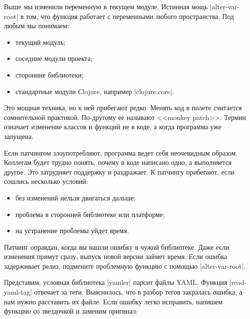 Выше мы изменили переменную в текущем модуле. Истинная мощь
\spverb|alter-var-root| в том, что функция работает с переменными любого
пространства. Под любым мы понимаем:

\begin{itemize}

\item
  текущий модуль;

\item
  соседние модули проекта;

\item
  сторонние библиотеки;

\item
  стандартные модули Сlojure, например \spverb|clojure.core|.

\end{itemize}

Это мощная техника, но к ней прибегают редко. Менять код в полете считается
сомнительной практикой. По-другому ее называют <<monkey
patch>>. Термин означает
изменение классов и функций не в коде, а когда программа уже запущена.

Если патчингом злоупотребляют, программа ведет себя неочевидным
образом. Коллегам будет трудно понять, почему в коде написано одно, а
выполняется другое. Это затрудняет поддержку и раздражает. К патчингу прибегают,
если сошлись несколько условий:

\begin{itemize}

\item
  без изменений нельзя двигаться дальше;

\item
  проблема в сторонней библиотеке или платформе;

\item
  на устранение проблемы уйдет время.

\end{itemize}

Патчинг оправдан, когда вы нашли ошибку в чужой библиотеке. Даже если изменения
примут сразу, выпуск новой версии займет время. Если ошибка задерживает релиз,
подмените проблемную функцию с помощью \spverb|alter-var-root|.

Представим, условная библиотека \spverb|yamler| парсит файлы YAML. Функция
\spverb|read-yaml-tag| отвечает за теги. Выяснилось, что в разбор тегов
закралась ошибка, а нам нужно расставить их файле. Если ошибку легко исправить,
напишем функцию со звездочкой и заменим оригинал:

